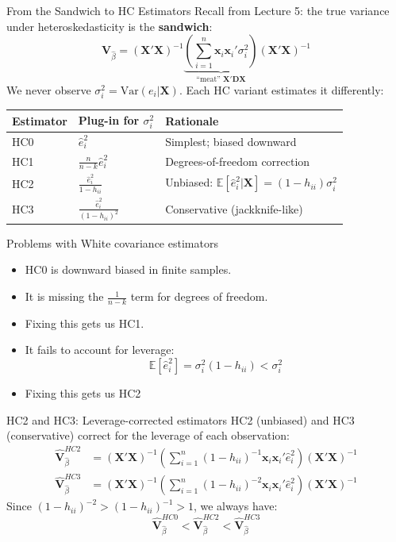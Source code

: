 \documentclass[aspectratio=169, handout, t]{beamer}
\numberwithin{equation}{section}
\begin{document}
\begin{frame}{From the Sandwich to HC Estimators}
Recall from Lecture 5: the true variance under heteroskedasticity is the \textbf{sandwich}:
$$\bm{V}_{\hat{\beta}}=(\bm{X'X})^{-1}\underbrace{\left(\sum_{i=1}^n \bm{x}_i\bm{x}_i'\sigma_i^2\right)}_{\text{``meat'' } \bm{X'DX}}(\bm{X'X})^{-1}$$\pause
We never observe $\sigma_i^2=\text{Var}(e_i|\bm{X})$.  Each HC variant estimates it differently:
\smallskip

\small
\renewcommand{\arraystretch}{1.15}
\begin{tabular}{lll}
\toprule
\textbf{Estimator} & \textbf{Plug-in for $\sigma_i^2$} & \textbf{Rationale} \\
\midrule
HC0 & $\hat{e}_i^2$ & Simplest; biased downward \\
HC1 & $\frac{n}{n-k}\hat{e}_i^2$ & Degrees-of-freedom correction \\
HC2 & $\frac{\hat{e}_i^2}{1-h_{ii}}$ & Unbiased: $\mathbb{E}[\hat{e}_i^2|\bm{X}]=(1-h_{ii})\sigma_i^2$ \\
HC3 & $\frac{\hat{e}_i^2}{(1-h_{ii})^2}$ & Conservative (jackknife-like) \\
\bottomrule
\end{tabular}
\renewcommand{\arraystretch}{1.0}
\end{frame}

\begin{frame}{Problems with White covariance estimators}
\begin{itemize}
\item HC0 is downward biased in finite samples.
\item It is missing the $\frac{1}{n-k}$ term for degrees of freedom. 
\item[$\rightarrow$] Fixing this gets us HC1.
\item It fails to account for leverage:
$$\mathbb{E}[\hat{e}_i^2]=\sigma^2_i(1-h_{ii})<\sigma^2_i$$
\item[$\rightarrow$] Fixing this gets us HC2
\end{itemize}
\end{frame}

\begin{frame}{HC2 and HC3: Leverage-corrected estimators}
HC2 (unbiased) and HC3 (conservative) correct for the leverage of each observation:
\begin{align*}
\hat{\bm{V}}^{HC2}_{\hat{\beta}}&=(\bm{X'X})^{-1}\!\left(\sum_{i=1}^n (1-h_{ii})^{-1} \bm{x}_i\bm{x}_i'\hat{e}_i^2\right)\!(\bm{X'X})^{-1}\\[4pt]
\hat{\bm{V}}^{HC3}_{\hat{\beta}}&=(\bm{X'X})^{-1}\!\left(\sum_{i=1}^n (1-h_{ii})^{-2}\bm{x}_i\bm{x}_i'\hat{e}_i^2\right)\!(\bm{X'X})^{-1}
\end{align*}
\medskip
Since $(1-h_{ii})^{-2}>(1-h_{ii})^{-1}>1$, we always have:
$$\hat{\bm{V}}^{HC0}_{\hat{\beta}}< \hat{\bm{V}}^{HC2}_{\hat{\beta}}< \hat{\bm{V}}^{HC3}_{\hat{\beta}}$$
\end{frame}
\end{document}
